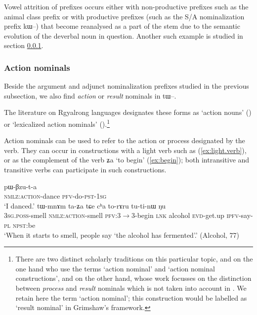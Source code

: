 \documentclass[oldfontcommands,oneside,a4paper,11pt]{article}
\newcommand{\ipa}[1]{{\phon \mbox{#1}}} %
\begin{document}
Vowel attrition of prefixes occurs either with non-productive prefixes such as the animal class prefix or with productive prefixes (such as the S/A nominalization prefix \ipa{kɯ}--) that become reanalysed as a part of the stem due to the semantic evolution of the deverbal noun in question. Another such example is studied in section \ref{subsubsec:action}.



\subsubsection{Action nominals } \label{subsubsec:action}
Beside the argument and adjunct nominalization prefixes studied in the previous subsection, we also find  \textit{action} or \textit{result} nominals in \ipa{tɯ}--. 

The literature on Rgyalrong languages designates these forms as `action nouns' (\citealt[455]{jacques04these}) or `lexicalized action nominals' (\citealt{jacksonlin07}).\footnote{There are two distinct scholarly traditions on this particular topic, \citet{comrie76nmlz} and \citet[5]{koptjevskaja93nmlz} on the one hand who use the terms `action nominal' and `action nominal constructions', and \citealt{grimshaw90argument} on the other hand, whose work focusses on the distinction between \textit{process} and \textit{result} nominals which is not taken into account in \citet{koptjevskaja93nmlz}. We retain here the term `action nominal'; this construction would be labelled as `result nominal' in Grimshaw's framework.}
 
Action nominals can be used to refer to the action or process designated by the verb. They can occur in constructions with a light verb such as  (\ref{ex:light.verb}), or as the complement of the verb \ipa{ʑa} `to begin' (\ref{ex:begin}); both intransitive and transitive verbs can participate in such constructions.

\begin{exe}
\ex \label{ex:light.verb}
\gll \ipa{tɯ-rɟaʁ} \ipa{pɯ-βzu-t-a} \\
\textsc{nmlz:action}-dance \textsc{pfv}-do-\textsc{pst-1sg} \\
\glt `I danced.'
\ex \label{ex:begin}
\gll \ipa{ɯ-di}   	\ipa{tɯ-mnɤm}   	\ipa{ta-ʑa}   	\ipa{tɕe}   	\ipa{cʰa}   	\ipa{to-rɤru}   	\ipa{tu-ti-nɯ}   	\ipa{ŋu}   \\
\textsc{3sg.poss}-smell \textsc{nmlz:action}-smell \textsc{pfv:3$\rightarrow$3}-begin \textsc{lnk} alcohol \textsc{evd}-get.up \textsc{ipfv}-say-\textsc{pl} \textsc{npst}:be \\
\glt `When it starts to smell, people say `the alcohol has fermented'.' (Alcohol, 77)
\end{exe} 
\end{document}
